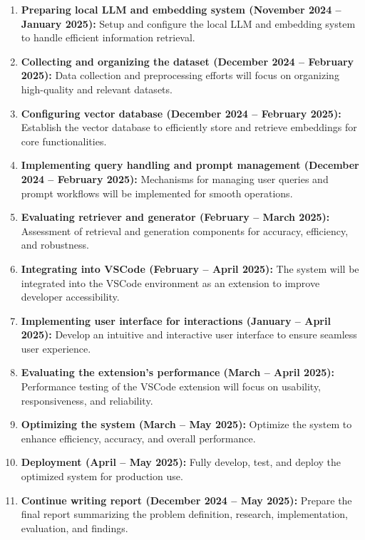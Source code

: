 \begin{enumerate}
	\item \textbf{Preparing local LLM and embedding system (November 2024 -- January 2025):}
	Setup and configure the local LLM and embedding system to handle efficient information retrieval.
	
	\item \textbf{Collecting and organizing the dataset (December 2024 -- February 2025):}
	Data collection and preprocessing efforts will focus on organizing high-quality and relevant datasets.
	
	\item \textbf{Configuring vector database (December 2024 -- February 2025):}
	Establish the vector database to efficiently store and retrieve embeddings for core functionalities.
	
	\item \textbf{Implementing query handling and prompt management (December 2024 -- February 2025):}
	Mechanisms for managing user queries and prompt workflows will be implemented for smooth operations.
	
	\item \textbf{Evaluating retriever and generator (February -- March 2025):}
	Assessment of retrieval and generation components for accuracy, efficiency, and robustness.
	
	\item \textbf{Integrating into VSCode (February -- April 2025):}
	The system will be integrated into the VSCode environment as an extension to improve developer accessibility.
	
	\item \textbf{Implementing user interface for interactions (January -- April 2025):}
	Develop an intuitive and interactive user interface to ensure seamless user experience.
	
	\item \textbf{Evaluating the extension's performance (March -- April 2025):}
	Performance testing of the VSCode extension will focus on usability, responsiveness, and reliability.
	
	\item \textbf{Optimizing the system (March -- May 2025):}
	Optimize the system to enhance efficiency, accuracy, and overall performance.
	
	\item \textbf{Deployment (April -- May 2025):}
	Fully develop, test, and deploy the optimized system for production use.
	
	\item \textbf{Continue writing report (December 2024 -- May 2025):}
	Prepare the final report summarizing the problem definition, research, implementation, evaluation, and findings.
\end{enumerate}


